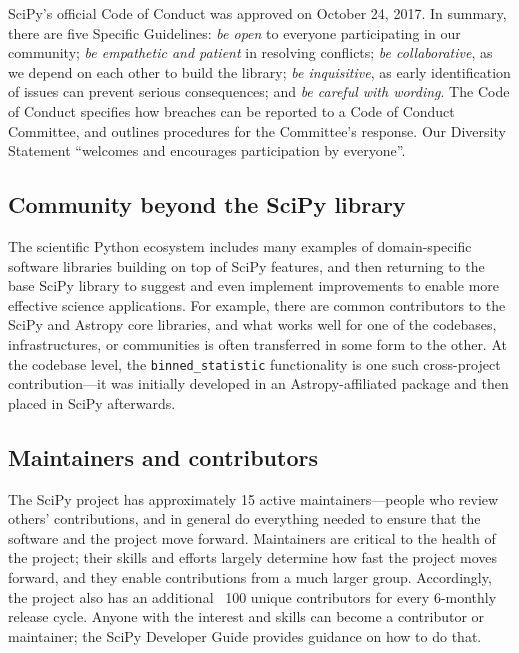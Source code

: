 \documentclass[fleqn,10pt]{wlscirep}
\begin{document}
SciPy's official Code of Conduct was approved on October 24, 2017. In summary, there are five Specific Guidelines:
\emph{be open} to everyone participating in our community;
\emph{be empathetic and patient} in resolving conflicts;
\emph{be collaborative}, as we depend on each other to build the library;
\emph{be inquisitive}, as early identification of issues can prevent serious consequences; and
\emph{be careful with wording}.
The Code of Conduct specifies how breaches can be reported to a Code of Conduct Committee, and outlines procedures for the Committee's response. Our Diversity Statement ``welcomes and encourages participation by everyone''.


\subsection*{Community beyond the SciPy library}

The scientific Python ecosystem includes many examples
of domain-specific software libraries building on top
of SciPy features, and then returning to the base SciPy library
to suggest and even implement improvements to enable
more effective science applications. For example, there
are common contributors to the SciPy and Astropy core
libraries\cite{astropy-2018}, and what works well for 
one of the codebases, infrastructures, or communities 
is often transferred in some form to the other. At the codebase 
level, the \texttt{binned\_statistic} functionality
is one such cross-project contribution---it was initially
developed in an Astropy-affiliated package
and then placed in SciPy afterwards.

\subsection*{Maintainers and contributors}

The SciPy project has approximately 15 active maintainers---people who review
others' contributions, and in general do everything needed to ensure that the
software and the project move forward. Maintainers are critical to the health
of the project\cite{eghbal2016}; their skills and efforts largely determine how
fast the project moves forward, and they enable contributions from a much
larger group. Accordingly, the project also has an additional ~100 unique
contributors for every 6-monthly release cycle. Anyone with the interest and
skills can become a contributor or maintainer; the SciPy Developer
Guide\cite{scipy-dev-guide} provides guidance on how to do that.
\end{document}
